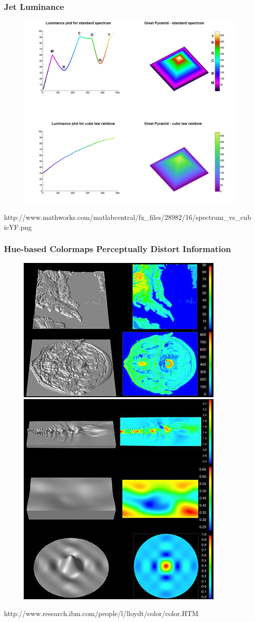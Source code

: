 \documentclass[ignorenonframetext]{beamer}
\begin{document}
\begin{frame}[t]\frametitle{Jet Luminance}
    \begin{figure}
    	\centering
    	\includegraphics[width=.6\textwidth]{figures/jet_luminance.jpg}
    \end{figure}
    \tiny{http://www.mathworks.com/matlabcentral/fx\_files/28982/16/spectrum\_vs\_cubicYF.png}
\end{frame}


\begin{frame}[t]\frametitle{Hue-based Colormaps Perceptually Distort Information}
    \begin{figure}
    	\centering
    	\includegraphics[width=.475\textwidth]{figures/bw_vs_jet1}
    	\includegraphics[width=.475\textwidth]{figures/bw_vs_jet2}
    \end{figure}
    \tiny{http://www.research.ibm.com/people/l/lloydt/color/color.HTM}
\end{frame}
\end{document}
